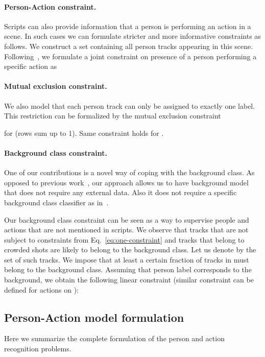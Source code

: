 \documentclass[10pt,twocolumn,letterpaper]{article}
\begin{document}
\paragraph{Person-Action constraint.} 
Scripts can also provide information that a person  is performing an action  in a scene. 
In such cases we can formulate stricter and more informative constraints as follows. 
We construct a set  containing all person tracks appearing in this scene. 
Following~\cite{bojanowski13finding}, we formulate a joint constraint on presence of a person performing a specific action as

\vspace{-.3cm}

\paragraph{Mutual exclusion constraint.}
We also model that each person track can only be assigned to exactly one label. This restriction can be formalized by the mutual exclusion constraint

for  (\ie rows sum up to 1). Same constraint holds for .
\vspace{-.3cm}

\paragraph{Background class constraint.} 
One of our contributions is a novel way of coping with the background class.
As opposed to previous work~\cite{bojanowski13finding}, our approach allows us to have background model that  does not require any external data.
Also it does not require a specific background class classifier as in~\cite{parkhi15it}. 

Our background class constraint can be seen as a way to supervise people and actions that are not mentioned in scripts.
We observe that tracks that are not subject to constraints from Eq.~\eqref{eq:one-constraint} and tracks that belong to crowded shots are likely to belong to the background class.
Let us denote by  the set of such tracks.
We impose that at least a certain fraction  of tracks in  must belong to the background class.
Assuming that person label  corresponds to the background, we obtain the following linear constraint (similar constraint can be defined for actions on ): 


\subsection{Person-Action model formulation}
\label{sec:jointmodel}
Here we summarize the complete formulation of the person and action recognition problems.  
\vspace{-.3cm}
\end{document}
